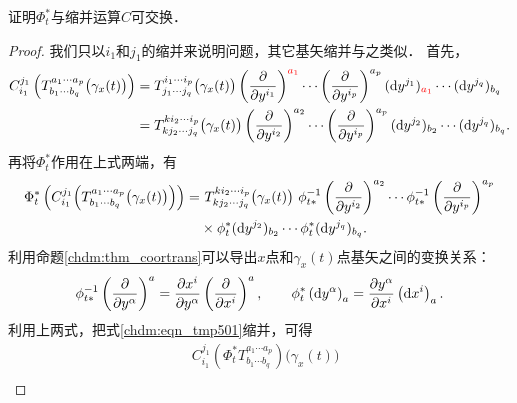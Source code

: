 \begin{proposition}\label{chdm:thm_cp-pc}
    证明$\Phi_t^*$与缩并运算$C$可交换．
\end{proposition}
\begin{proof}
    我们只以$i_1$和$j_1$的缩并来说明问题，其它基矢缩并与之类似．    首先，
    \begin{align*}
        C_{i_1}^{j_1} \left(T^{a_1 \cdots a_p}_{b_1\cdots b_q}\bigl(\gamma_x(t)\bigr) \right)
        &= T^{i_1 \cdots i_p}_{j_1\cdots j_q}\bigl(\gamma_x(t)\bigr)
        \left(\frac{\partial }{\partial y^{i_1}}\right)^{\color{red} a_1} \cdots 
        \left(\frac{\partial }{\partial y^{i_p}}\right)^{a_p} 
        ({\rm d}y^{j_1})_{\color{red} a_1} \cdots  ({\rm d}y^{j_q})_{b_q} \\
        &= T^{k i_2 \cdots i_p}_{k j_2\cdots j_q}\bigl(\gamma_x(t)\bigr)
        \left(\frac{\partial }{\partial y^{i_2}}\right)^{a_2} \cdots 
        \left(\frac{\partial }{\partial y^{i_p}}\right)^{a_p} 
        ({\rm d}y^{j_2})_{b_2} \cdots  ({\rm d}y^{j_q})_{b_q} .
    \end{align*}
再将$\Phi_t^*$作用在上式两端，有
    \begin{align}
        \Phi_t^* \left(  C_{i_1}^{j_1} \Bigl( T^{a_1 \cdots a_p}_{b_1\cdots b_q}\bigl(\gamma_x(t)\bigr)\Bigr) \right) 
        =& \ T^{k i_2 \cdots i_p}_{k j_2\cdots j_q}\bigl(\gamma_x(t)\bigr) \ 
        \phi_{t*} ^{-1}  \left(\frac{\partial }{\partial y^{i_2}}\right)^{a_2} \cdots 
        \phi_{t*} ^{-1} \left(\frac{\partial }{\partial y^{i_p}}\right)^{a_p} \notag\\
        & \times \phi_{t}^{*}({\rm d}y^{j_2})_{b_2} \cdots \phi_{t}^{*} ({\rm d}y^{j_q})_{b_q}  .
        \label{chdm:eqn_tmpa852}
    \end{align}
利用命题\ref{chdm:thm_coortrans}可以导出$x$点和$\gamma_x(t)$点基矢之间的变换关系：
\begin{equation}\label{chdm:eqn_tmp-transxy}
    \phi_{t*}^{-1} \left(\frac{\partial}{\partial y^\alpha}\right)^a 
     = \frac{\partial x^i}{\partial y^\alpha}
    \left(\frac{\partial}{\partial x^i}\right)^a , \qquad
    {\phi^{*}_{t}}\left( {{\rm{d}}{y^\alpha }} \right)_a =
    \frac{{\partial {y^\alpha }}}{{\partial {x^i}}} 
    \left( {{\rm{d}}{x^i }} \right)_a  .
\end{equation}
利用上两式，把式\eqref{chdm:eqn_tmp501}缩并，可得
\begin{equation*}%
    \begin{aligned}
       &C_{i_1}^{j_1}\left (\Phi_t^* T^{a_1 \cdots a_p}_{b_1\cdots b_q}\right)\bigl(\gamma_x(t)\bigr) \\

\end{aligned}
\end{equation*}
\end{proof}
